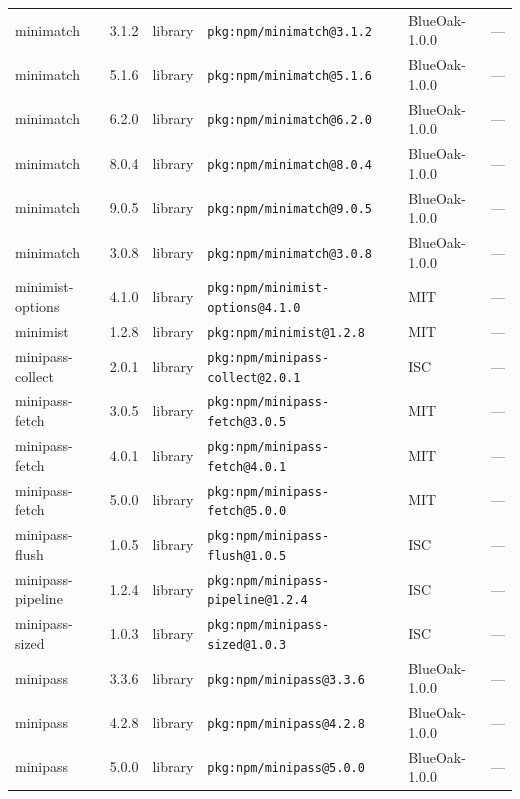 \documentclass[11pt,a4paper]{article}
\begin{document}
\begin{longtable}{|p{4cm}|p{2cm}|p{1.6cm}|p{5cm}|p{1.5cm}|p{3.5cm}|}
\raggedright minimatch & 3.1.2 & library & \small\texttt{pkg:npm/minimatch@3.1.2} & BlueOak-1.0.0 & \small — \\
\raggedright minimatch & 5.1.6 & library & \small\texttt{pkg:npm/minimatch@5.1.6} & BlueOak-1.0.0 & \small — \\
\raggedright minimatch & 6.2.0 & library & \small\texttt{pkg:npm/minimatch@6.2.0} & BlueOak-1.0.0 & \small — \\
\raggedright minimatch & 8.0.4 & library & \small\texttt{pkg:npm/minimatch@8.0.4} & BlueOak-1.0.0 & \small — \\
\raggedright minimatch & 9.0.5 & library & \small\texttt{pkg:npm/minimatch@9.0.5} & BlueOak-1.0.0 & \small — \\
\raggedright minimatch & 3.0.8 & library & \small\texttt{pkg:npm/minimatch@3.0.8} & BlueOak-1.0.0 & \small — \\
\raggedright minimist-options & 4.1.0 & library & \small\texttt{pkg:npm/minimist-options@4.1.0} & MIT & \small — \\
\raggedright minimist & 1.2.8 & library & \small\texttt{pkg:npm/minimist@1.2.8} & MIT & \small — \\
\raggedright minipass-collect & 2.0.1 & library & \small\texttt{pkg:npm/minipass-collect@2.0.1} & ISC & \small — \\
\raggedright minipass-fetch & 3.0.5 & library & \small\texttt{pkg:npm/minipass-fetch@3.0.5} & MIT & \small — \\
\raggedright minipass-fetch & 4.0.1 & library & \small\texttt{pkg:npm/minipass-fetch@4.0.1} & MIT & \small — \\
\raggedright minipass-fetch & 5.0.0 & library & \small\texttt{pkg:npm/minipass-fetch@5.0.0} & MIT & \small — \\
\raggedright minipass-flush & 1.0.5 & library & \small\texttt{pkg:npm/minipass-flush@1.0.5} & ISC & \small — \\
\raggedright minipass-pipeline & 1.2.4 & library & \small\texttt{pkg:npm/minipass-pipeline@1.2.4} & ISC & \small — \\
\raggedright minipass-sized & 1.0.3 & library & \small\texttt{pkg:npm/minipass-sized@1.0.3} & ISC & \small — \\
\raggedright minipass & 3.3.6 & library & \small\texttt{pkg:npm/minipass@3.3.6} & BlueOak-1.0.0 & \small — \\
\raggedright minipass & 4.2.8 & library & \small\texttt{pkg:npm/minipass@4.2.8} & BlueOak-1.0.0 & \small — \\
\raggedright minipass & 5.0.0 & library & \small\texttt{pkg:npm/minipass@5.0.0} & BlueOak-1.0.0 & \small — \\

\end{longtable}
\end{document}
